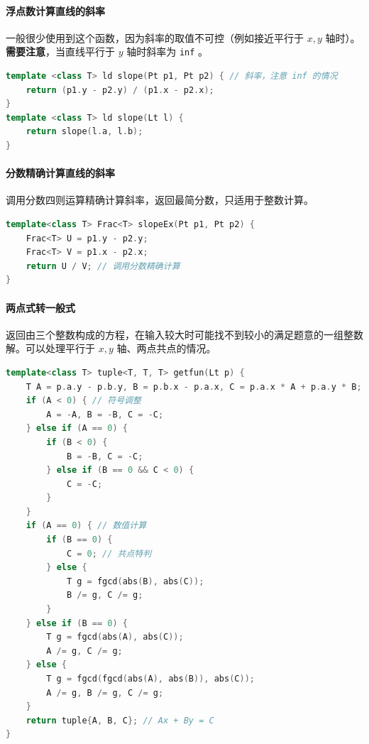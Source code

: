 \hypertarget{ux6d6eux70b9ux6570ux8ba1ux7b97ux76f4ux7ebfux7684ux659cux7387}{%
\paragraph{浮点数计算直线的斜率}\label{ux6d6eux70b9ux6570ux8ba1ux7b97ux76f4ux7ebfux7684ux659cux7387}}

一般很少使用到这个函数，因为斜率的取值不可控（例如接近平行于 \(x,y\) 轴时）。\textbf{需要注意}，当直线平行于 \(y\) 轴时斜率为 \passthrough{\lstinline!inf!} 。

\begin{lstlisting}[language={C++}]
template <class T> ld slope(Pt p1, Pt p2) { // 斜率，注意 inf 的情况
    return (p1.y - p2.y) / (p1.x - p2.x);
}
template <class T> ld slope(Lt l) {
    return slope(l.a, l.b);
}
\end{lstlisting}

\hypertarget{ux5206ux6570ux7cbeux786eux8ba1ux7b97ux76f4ux7ebfux7684ux659cux7387}{%
\paragraph{分数精确计算直线的斜率}\label{ux5206ux6570ux7cbeux786eux8ba1ux7b97ux76f4ux7ebfux7684ux659cux7387}}

调用分数四则运算精确计算斜率，返回最简分数，只适用于整数计算。

\begin{lstlisting}[language={C++}]
template<class T> Frac<T> slopeEx(Pt p1, Pt p2) {
    Frac<T> U = p1.y - p2.y;
    Frac<T> V = p1.x - p2.x;
    return U / V; // 调用分数精确计算
}
\end{lstlisting}

\hypertarget{ux4e24ux70b9ux5f0fux8f6cux4e00ux822cux5f0f}{%
\paragraph{两点式转一般式}\label{ux4e24ux70b9ux5f0fux8f6cux4e00ux822cux5f0f}}

返回由三个整数构成的方程，在输入较大时可能找不到较小的满足题意的一组整数解。可以处理平行于 \(x,y\) 轴、两点共点的情况。

\begin{lstlisting}[language={C++}]
template<class T> tuple<T, T, T> getfun(Lt p) {
    T A = p.a.y - p.b.y, B = p.b.x - p.a.x, C = p.a.x * A + p.a.y * B;
    if (A < 0) { // 符号调整
        A = -A, B = -B, C = -C;
    } else if (A == 0) {
        if (B < 0) {
            B = -B, C = -C;
        } else if (B == 0 && C < 0) {
            C = -C;
        }
    }
    if (A == 0) { // 数值计算
        if (B == 0) {
            C = 0; // 共点特判
        } else {
            T g = fgcd(abs(B), abs(C));
            B /= g, C /= g;
        }
    } else if (B == 0) {
        T g = fgcd(abs(A), abs(C));
        A /= g, C /= g;
    } else {
        T g = fgcd(fgcd(abs(A), abs(B)), abs(C));
        A /= g, B /= g, C /= g;
    }
    return tuple{A, B, C}; // Ax + By = C
}
\end{lstlisting}

